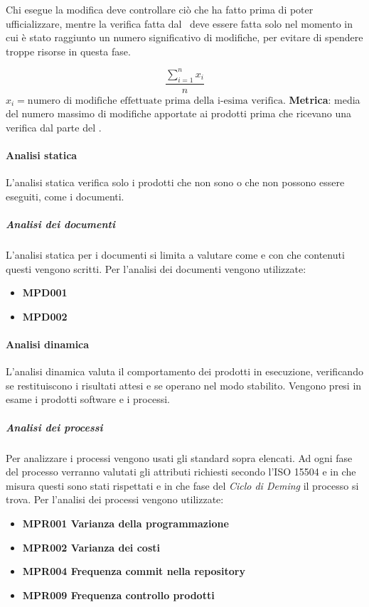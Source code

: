 				Chi esegue la modifica deve controllare ciò che ha fatto prima di poter ufficializzare, mentre la verifica fatta dal \Ver\ deve essere fatta solo nel momento in cui è stato raggiunto un numero significativo di modifiche, per evitare di spendere troppe risorse in questa fase.
			
				\[\dfrac{\sum_{i=1}^{n} x_i}{n}\]
				$x_i=\text{numero di modifiche effettuate prima della i-esima verifica.}$
				\textbf{Metrica}: media del numero massimo di modifiche apportate ai prodotti prima che ricevano una verifica dal parte del \Ver.

			\paragraph{Analisi statica}
			L'analisi statica verifica solo i prodotti che non sono o che non possono essere eseguiti, come i documenti.

				\subparagraph{Analisi dei documenti}
				L'analisi statica per i documenti si limita a valutare come e con che contenuti questi vengono scritti.
				Per l'analisi dei documenti vengono utilizzate:

				\begin{itemize}
					\item \textbf{MPD001}
					\item \textbf{MPD002}
				\end{itemize}

			\paragraph{Analisi dinamica}
			L'analisi dinamica valuta il comportamento dei prodotti in esecuzione, verificando se restituiscono i risultati attesi e se operano nel modo stabilito.
			Vengono presi in esame i prodotti software e i processi.

				\subparagraph{Analisi dei processi}
				Per analizzare i processi vengono usati gli standard sopra elencati. Ad ogni fase del processo verranno valutati gli attributi richiesti secondo l'ISO 15504 e in che misura questi sono stati rispettati e in che fase del \textit{Ciclo di Deming} il processo si trova.
				Per l'analisi dei processi vengono utilizzate:

				\begin{itemize}
					\item \textbf{MPR001 Varianza della programmazione}
					\item \textbf{MPR002 Varianza dei costi}
					\item \textbf{MPR004 Frequenza commit nella repository}
					\item \textbf{MPR009 Frequenza controllo prodotti}
				\end{itemize}





